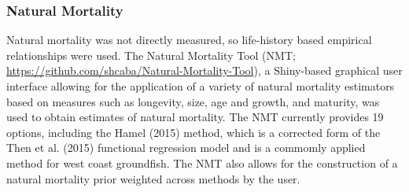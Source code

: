\documentclass[11pt,
  english,
  a4paper,
]{article}
\begin{document}
\leavevmode\tagmcend\tagstructend\par


\hypertarget{natural-mortality}{%
\subsubsection{Natural Mortality}\label{natural-mortality}}

\leavevmode\tagmcend\tagstructend


Natural mortality was not directly measured, so life-history based empirical relationships were used. The Natural Mortality Tool (NMT; {\url{https://github.com/shcaba/Natural-Mortality-Tool}\leavevmode\tagmcend\tagstructend}), a Shiny-based graphical user interface allowing for the application of a variety of natural mortality estimators based on measures such as longevity, size, age and growth, and maturity, was used to obtain estimates of natural mortality. The NMT currently provides 19 options, including the Hamel {(2015)\leavevmode\tagmcend\tagstructend} method, which is a corrected form of the Then et al. {(2015)\leavevmode\tagmcend\tagstructend} functional regression model and is a commomly applied method for west coast groundfish. The NMT also allows for the construction of a natural mortality prior weighted across methods by the user.

\leavevmode\tagmcend\tagstructend\par

\end{document}

